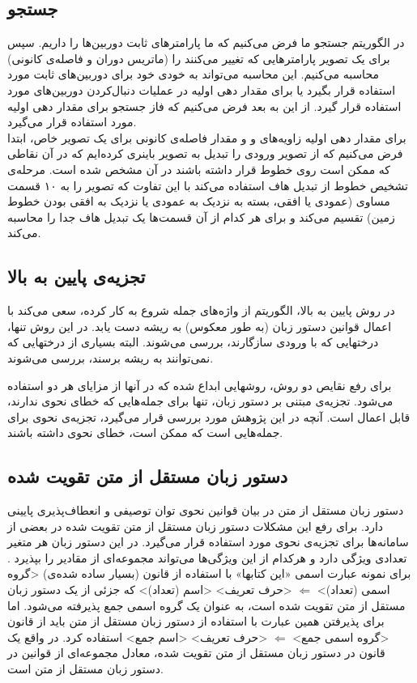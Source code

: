 \documentclass{report}
\begin{document}
\subsection{جستجو}
در الگوریتم جستجو ما فرض می‌کنیم که ما پارامترهای ثابت دوربین‌ها را داریم. سپس برای یک تصویر پارامترهایی که تغییر می‌کنند را (ماتریس دوران و فاصله‌ی کانونی) محاسبه می‌کنیم. این محاسبه می‌تواند به خودی خود برای دوربین‌های ثابت مورد استفاده قرار بگیرد یا برای مقدار دهی اولیه در عملیات دنبال‌کردن دوربین‌های مورد استفاده قرار گیرد. از این به بعد فرض می‌کنیم که فاز جستجو برای مقدار دهی اولیه مورد استفاده قرار می‌گیرد.
\\
برای مقدار دهی اولیه زاویه‌های  و  و مقدار فاصله‌ی کانونی برای یک تصویر خاص، ابتدا فرض می‌کنیم که از تصویر ورودی را تبدیل به تصویر باینری کرده‌ایم که در آن نقاطی که ممکن است روی خطوط قرار داشته باشند در آن مشخص شده است. مرحله‌ی تشخیص خطوط از تبدیل هاف استفاده می‌کند با این تفاوت که تصویر را به ۱۰ قسمت مساوی (عمودی یا افقی، بسته به نزدیک به عمودی یا نزدیک به افقی بودن خطوط زمین) تقسیم می‌کند و برای هر کدام از آن قسمت‌ها یک تبدیل هاف جدا را محاسبه می‌کند.
\subsection{تجزیه‌ی پایین به بالا}
در روش پایین به بالا، الگوریتم از واژه‌های جمله شروع به کار کرده، سعی می‌کند با اعمال قوانین دستور زبان (‌به طور معکوس‌) به ریشه دست‌ یابد. در این روش تنها، درختهایی که با ورودی سازگارند، بررسی می‌شوند. البته بسیاری از درختهایی که نمی‌توانند به ریشه برسند، بررسی می‌شوند.

برای رفع نقایص دو روش، روشهایی ابداع شده که در آنها از مزایای هر دو استفاده می‌شود. تجزیه‌ی مبتنی بر دستور زبان، تنها برای جمله‌هایی که خطای نحوی ندارند، قابل اعمال است. آنچه در این پژوهش مورد بررسی قرار می‌گیرد، تجزیه‌ی نحوی برای جمله‌هایی است که ممکن است، خطای نحوی داشته باشند.

\subsection{دستور زبان مستقل از متن تقویت شده}
دستور زبان مستقل از متن در بیان قوانین نحوی توان توصیفی و انعطاف‌پذیری پایینی دارد. برای رفع این مشکلات دستور زبان مستقل از متن تقویت شده‌ در بعضی از سامانه‌ها برای تجزیه‌ی نحوی مورد استفاده قرار می‌گیرد. در این دستور زبان هر متغیر تعدادی ویژگی دارد و هرکدام از این ویژگی‌ها می‌تواند مجموعه‌ای از مقادیر را بپذیرد \cite{ct4}. 
برای نمونه عبارت اسمی «این کتابها» با استفاده از قانون (بسیار ساده شده‌ی)
<گروه اسمی (تعداد)> $\Longleftarrow$ <حرف تعریف> <اسم (تعداد)>
که جزئی از یک دستور زبان مستقل از متن تقویت شده است، به عنوان یک گروه اسمی جمع پذیرفته می‌شود. اما برای پذیرفتن همین عبارت با استفاده از دستور زبان مستقل از متن باید از قانون 
<گروه اسمی جمع> $\Longleftarrow$ <حرف تعریف> <اسم جمع>
استفاده کرد. در واقع یک قانون در دستور زبان مستقل از متن تقویت شده، معادل مجموعه‌ای از قوانین در دستور زبان مستقل از متن است. 
\end{document}
